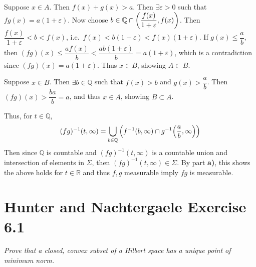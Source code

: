 \documentclass[12pt]{article}
\newcommand{\E}{\varepsilon}
\theoremstyle{plain}
\begin{document}
Suppose $x \in A$.  Then $f(x) + g(x) > a$.  Then $\exists \E > 0$ such that $fg(x) = a(1 + \E)$.  Now choose $b \in \mathbb{Q}\cap\qty(\dfrac{f(x)}{1 + \E}, f(x))$.  Then $\dfrac{f(x)}{1 + \E} < b < f(x)$, i.e.~$f(x) < b(1 + \E) < f(x)(1 + \E)$.  If $g(x) \leq \dfrac{a}{b}$, then $(fg)(x) \leq \dfrac{af(x)}{b} < \dfrac{ab(1 + \E)}{b} = a(1 + \E)$, which is a contradiction since $(fg)(x) = a(1 + \E)$.  Thus $x \in B$, showing $A \subset B$.

Suppose $x \in B$.  Then $\exists b \in \mathbb{Q}$ such that $f(x) > b$ and $g(x) > \dfrac{a}{b}$.  Then $(fg)(x) > \dfrac{ba}{b} = a$, and thus $x \in A$, showing $B \subset A$.

Thus, for $t \in \mathbb{Q}$,
\begin{align*}
    (fg)^{-1}(t, \infty) = \bigcup_{b \in \mathbb{Q}}\qty(f^{-1}(b, \infty)\cap g^{-1}\qty(\frac{a}{b}, \infty))
\end{align*}
Then since $\mathbb{Q}$ is countable and $(fg)^{-1}(t, \infty)$ is a countable union and intersection of elements in $\Sigma$, then $(fg)^{-1}(t, \infty) \in \Sigma$.  By part \textbf{a)}, this shows the above holds for $t \in \mathbb{R}$ and thus $f, g$ measurable imply $fg$ is measurable.

\section*{Hunter and Nachtergaele Exercise 6.1}
\emph{Prove that a closed, convex subset of a Hilbert space has a unique point of minimum norm.} \\
\end{document}
